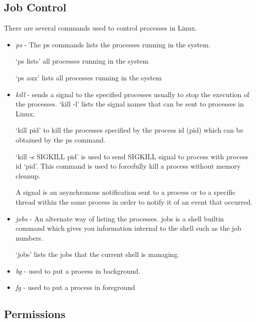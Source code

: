 \documentclass{article}
\begin{document}
\subsection{Job Control}
There are several commands used to control processes in Linux.
\begin{itemize}
\item \textit{ps} - The ps commands lists the processes running in the system.

\hspace{10mm} `ps lists' all processes running in the system

\hspace{10mm} `ps aux' lists all processes running in the system

\item \textit{kill} - sends a signal to the specified processes usually to stop the execution of the processes.
\hspace{10mm} `kill -l' lists the signal names that can be sent to processes in Linux.

\hspace{10mm} `kill pid' to kill the processes specified by the process id (pid) which can be obtained by the ps command.

\hspace{10mm} `kill -s SIGKILL pid' is used to send SIGKILL signal to process with process id `pid'. This command is used to forcefully kill a process without memory cleanup.

\hspace{10mm} A signal is an asynchronous notification sent to a process or to a specific thread within the same process in order to notify it of an event that occurred.

\item \textit{jobs} -  An alternate way of listing the processes. jobs is a shell builtin command which gives you information internal to the shell such as the job numbers.

\hspace{10mm} `jobs' lists the jobs that the current shell is managing.

\item \textit{bg} - used to put a process in background.

\item \textit{fg} - used to put a process in foreground

\end{itemize}

\subsection{Permissions}
\end{document}

